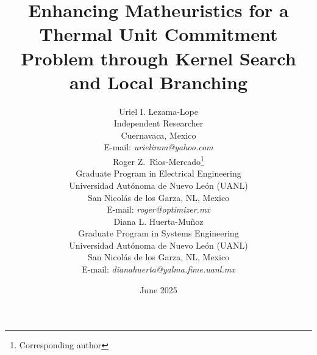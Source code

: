 \documentclass[letterpaper,titlepage,11pt]{article}
\title{Enhancing Matheuristics for a Thermal Unit Commitment Problem through Kernel Search and Local Branching}
\author{%
{Uriel I. Lezama-Lope}\\%
Independent Researcher\\
Cuernavaca, Mexico\\%
E-mail: \textit{urieliram@yahoo.com}\\[1em]
%
{Roger Z.\ R\'{\i}os-Mercado}\thanks{Corresponding author}\\%
Graduate Program in Electrical Engineering\\%
Universidad Aut\'onoma de Nuevo Le\'on (UANL)\\%
San Nicol\'as de los Garza, NL, Mexico\\%
E-mail: \textit{roger@optimizer.mx}\\[1em]
{Diana L. Huerta-Mu{\~n}oz}\\%
Graduate Program in Systems Engineering\\%
Universidad Aut\'onoma de Nuevo Le\'on (UANL)\\%
San Nicol\'as de los Garza, NL, Mexico\\%
E-mail: \textit{dianahuerta@yalma.fime.uanl.mx}\\
}
\date{June 2025}
\begin{document}
\maketitle


\begin{abstract}




\end{abstract}
\end{document}
